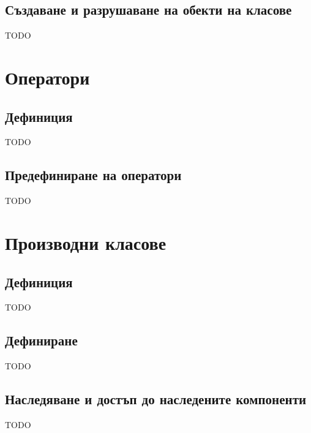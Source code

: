 \documentclass[fleqn,12pt]{article}
\begin{document}
\subsection{Създаване и разрушаване на обекти на класове}
TODO


\section{Оператори}
\subsection{Дефиниция}
TODO

\subsection{Предефиниране на оператори}
TODO


\section{Производни класове}
\subsection{Дефиниция}
TODO

\subsection{Дефиниране}
TODO

\subsection{Наследяване и достъп до наследените компоненти}
TODO
\end{document}
